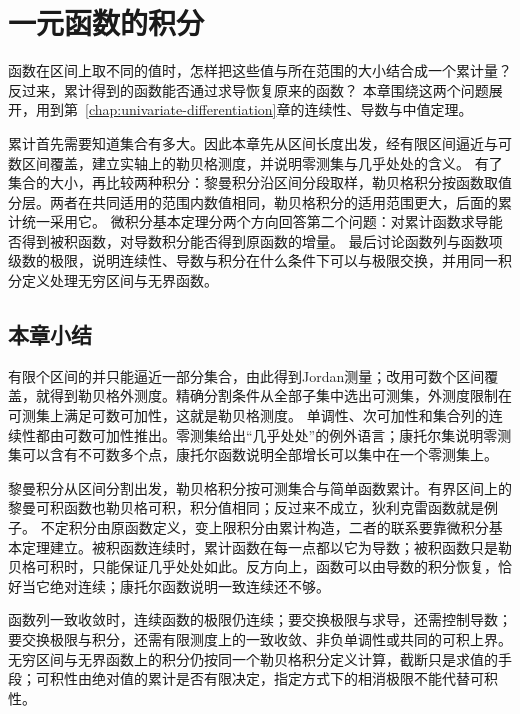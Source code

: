 \chapter{一元函数的积分}
\label{chap:univariate-integration}
\label{chap:measurable-functions}

函数在区间上取不同的值时，怎样把这些值与所在范围的大小结合成一个累计量？反过来，累计得到的函数能否通过求导恢复原来的函数？
本章围绕这两个问题展开，用到第~\ref{chap:univariate-differentiation}章的连续性、导数与中值定理。

累计首先需要知道集合有多大。因此本章先从区间长度出发，经有限区间逼近与可数区间覆盖，建立实轴上的勒贝格测度，并说明零测集与几乎处处的含义。
有了集合的大小，再比较两种积分：黎曼积分沿区间分段取样，勒贝格积分按函数取值分层。两者在共同适用的范围内数值相同，勒贝格积分的适用范围更大，后面的累计统一采用它。
微积分基本定理分两个方向回答第二个问题：对累计函数求导能否得到被积函数，对导数积分能否得到原函数的增量。
最后讨论函数列与函数项级数的极限，说明连续性、导数与积分在什么条件下可以与极限交换，并用同一积分定义处理无穷区间与无界函数。




\FloatBarrier
\section{本章小结}
\label{sec:measurable-summary}

有限个区间的并只能逼近一部分集合，由此得到Jordan测量；改用可数个区间覆盖，就得到勒贝格外测度。精确分割条件从全部子集中选出可测集，外测度限制在可测集上满足可数可加性，这就是勒贝格测度。
单调性、次可加性和集合列的连续性都由可数可加性推出。零测集给出“几乎处处”的例外语言；康托尔集说明零测集可以含有不可数多个点，康托尔函数说明全部增长可以集中在一个零测集上。

黎曼积分从区间分割出发，勒贝格积分按可测集合与简单函数累计。有界区间上的黎曼可积函数也勒贝格可积，积分值相同；反过来不成立，狄利克雷函数就是例子。
不定积分由原函数定义，变上限积分由累计构造，二者的联系要靠微积分基本定理建立。被积函数连续时，累计函数在每一点都以它为导数；被积函数只是勒贝格可积时，只能保证几乎处处如此。反方向上，函数可以由导数的积分恢复，恰好当它绝对连续；康托尔函数说明一致连续还不够。

函数列一致收敛时，连续函数的极限仍连续；要交换极限与求导，还需控制导数；要交换极限与积分，还需有限测度上的一致收敛、非负单调性或共同的可积上界。
无穷区间与无界函数上的积分仍按同一个勒贝格积分定义计算，截断只是求值的手段；可积性由绝对值的累计是否有限决定，指定方式下的相消极限不能代替可积性。
